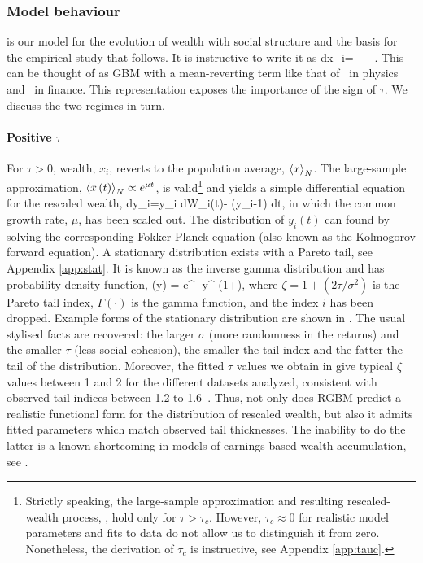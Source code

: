 \subsubsection{Model behaviour}\label{sec:model_behavior}
 is our model for the evolution of wealth with social structure and the basis for the empirical study that follows. It is instructive to write it as
\be
dx_i=_{} \;\; _{}.
\ee
This can be thought of as GBM with a mean-reverting term like that of~\cite{UhlenbeckOrnstein1930} in physics and~\cite{Vasicek1977} in finance. This representation exposes the importance of the sign of $\tau$. We discuss the two regimes in turn.

\paragraph{Positive $\tau$}
For $\tau>0$, wealth, $x_i$, reverts to the population average, $\left\langle x \right\rangle_N$. The large-sample approximation, $\left\langle x\left(t\right) \right\rangle_N \propto e^{\mu t}$, is valid\footnote{Strictly speaking, the large-sample approximation and resulting rescaled-wealth process, , hold only for $\tau>\tau_c$. However, $\tau_c \approx 0$ for realistic model parameters and fits to data do not allow us to distinguish it from zero. Nonetheless, the derivation of $\tau_c$ is instructive, see Appendix \ref{app:tauc}.} and yields a simple differential equation for the rescaled wealth,
\be
dy_i=y_i \sigma dW_i\left(t\right)- \tau (y_i-1) dt,
\ee
in which the common growth rate, $\mu$, has been scaled out. The distribution of $y_i\left(t\right)$ can found by solving the corresponding Fokker-Planck equation (also known as the Kolmogorov forward equation). A stationary distribution exists with a Pareto tail, see Appendix \ref{app:stat}. It is known as the inverse gamma distribution and has probability density function,
\be
{}\left(y\right) = \frac{\left(\zeta-1\right)^\zeta}{\Gamma\left(\zeta\right)} e^{-} y^{-\left(1+\zeta\right)},
\ee
where $\zeta=1+\left(2\tau/\sigma^2\right)$ is the Pareto tail index, $\Gamma\left(\cdot\right)$ is the gamma function, and the index $i$ has been dropped. Example forms of the stationary distribution are shown in . The usual stylised facts are recovered: the larger $\sigma$ (more randomness in the returns) and the smaller $\tau$ (less social cohesion), the smaller the tail index and the fatter the tail of the distribution. Moreover, the fitted $\tau$ values we obtain in  give typical $\zeta$ values between 1 and 2 for the different datasets analyzed, consistent with observed tail indices between 1.2 to 1.6~\cite{klass2006forbes,gabaix2009power,brzezinski2014wealth,vermeulen2017fat}. Thus, not only does RGBM predict a realistic functional form for the distribution of rescaled wealth, but also it admits fitted parameters which match observed tail thicknesses. The inability to do the latter is a known shortcoming in models of earnings-based wealth accumulation, see .


